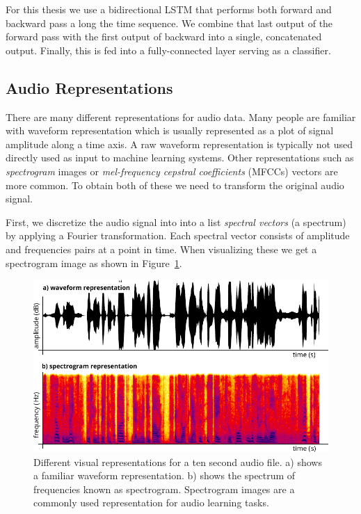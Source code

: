 	For this thesis we use a bidirectional LSTM that performs both forward and backward pass a long the time sequence. We combine that last output of the forward pass with the first output of backward into a single, concatenated output. Finally, this is fed into a fully-connected layer serving as a classifier.
	
\subsection{Audio Representations}
There are many different representations for audio data. Many people are familiar with waveform representation which is usually represented as a plot of signal amplitude along a time axis. A raw waveform representation is typically not used directly used as input to machine learning systems.
Other representations such as \emph{spectrogram} images or \emph{mel-frequency cepstral coefficients} (MFCCs) vectors are more common. To obtain both of these we need to transform the original audio signal.

First, we discretize the audio signal into into a list \emph{spectral vectors} (a spectrum) by applying a Fourier transformation. Each spectral vector consists of amplitude and frequencies pairs at a point in time. When visualizing these we get a spectrogram image as shown in Figure~\ref{fig:waveform}. 
%
	\begin{figure}[tp]
  		\centering
    	\includegraphics{img/waveform.pdf}
    	\caption{Different visual representations for a ten second audio file. a) shows a familiar waveform representation. b) shows the spectrum of frequencies known as spectrogram. Spectrogram images  are a commonly used representation for audio learning tasks.}
    	\label{fig:waveform}
	\end{figure}
%

